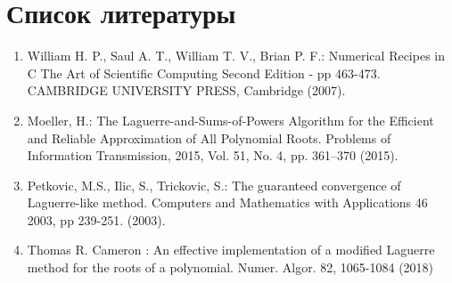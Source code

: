 \documentclass[a4paper,12pt]{article}
\begin{document}
\section{Список литературы}
\begin{enumerate}
    \item William H. P., Saul A. T., William T. V., Brian P. F.: Numerical Recipes in C The Art of Scientific Computing Second Edition - pp 463-473. CAMBRIDGE UNIVERSITY PRESS, Cambridge (2007).
    \item Moeller, H.: The Laguerre-and-Sums-of-Powers Algorithm for the Efficient and Reliable Approximation of All Polynomial Roots. Problems of Information Transmission, 2015, Vol. 51, No. 4, pp. 361–370 (2015).
    \item Petkovic, M.S., Ilic, S., Trickovic, S.: The guaranteed convergence of Laguerre-like method. Computers and Mathematics with Applications 46 2003, pp 239-251. (2003).
    \item Thomas R. Cameron : An effective implementation of a modified Laguerre
    method for the roots of a polynomial. Numer. Algor. 82, 1065-1084 (2018)
\end{enumerate}
\end{document}
